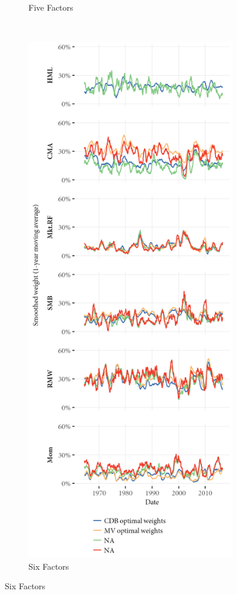 \begin{figure}[!ht]
\begin{subfigure}{0.45\textwidth}
    \caption{Five Factors}
  \end{subfigure}
  ~
  \begin{subfigure}{0.45\textwidth}
    \includegraphics[width=\textwidth]{graphics/weights/compare_Weights_CDB_MV_6F.png}
    \caption{Six Factors}
  \end{subfigure}  

  \label{fig:mv_cdb_weights}
\end{figure}

